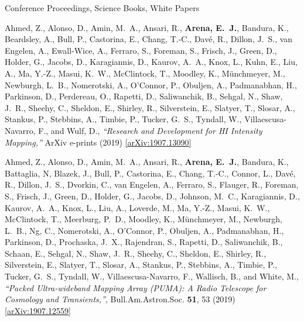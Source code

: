 \documentclass{resume} %
\begin{document}
\begin{rSection}{Conference Proceedings, Science Books, White Papers}

\begin{etaremune}

\item {Ahmed}, Z., {Alonso}, D., {Amin}, M.~A.,
         {Ansari}, R., \textbf{{Arena}, E.~J.}, {Bandura}, K.,
         {Beardsley}, A., {Bull}, P., {Castorina}, E.,
         {Chang}, T.-C., {Dav{\'e}}, R., {Dillon}, J.~S.,
         {van Engelen}, A., {Ewall-Wice}, A., {Ferraro}, S.,
         {Foreman}, S., {Frisch}, J., {Green}, D.,
         {Holder}, G., {Jacobs}, D., {Karagiannis}, D.,
         {Kaurov}, A.~A., {Knox}, L., {Kuhn}, E.,
         {Liu}, A., {Ma}, Y.-Z., {Masui}, K.~W.,
         {McClintock}, T., {Moodley}, K.,
         {M{\"u}nchmeyer}, M., {Newburgh}, L.~B.,
         {Nomerotski}, A., {O'Connor}, P., {Obuljen}, A.,
         {Padmanabhan}, H., {Parkinson}, D., {Perdereau}, O.,
         {Rapetti}, D., {Saliwanchik}, B., {Sehgal}, N.,
         {Shaw}, J.~R., {Sheehy}, C., {Sheldon}, E.,
         {Shirley}, R., {Silverstein}, E., {Slatyer}, T.,
         {Slosar}, A., {Stankus}, P., {Stebbins}, A.,
         {Timbie}, P., {Tucker}, G.~S., {Tyndall}, W.,
         {Villaescusa-Navarro}, F., and {Wulf}, D.,
         \textit{``Research and Development for HI Intensity Mapping,''} ArXiv e-prints (2019) \href{https://arxiv.org/abs/1907.13090}{[arXiv:1907.13090]}

\item {Ahmed}, Z., {Alonso}, D., {Amin}, M.~A.,
         {Ansari}, R., \textbf{{Arena}, E.~J.}, {Bandura}, K.,
         {Battaglia}, N, {Blazek}, J., 
         {Bull}, P., {Castorina}, E.,
         {Chang}, T.-C., {Connor}, L., {Dav{\'e}}, R., {Dillon}, J.~S.,
         {Dvorkin}, C.,
         {van Engelen}, A., {Ferraro}, S., {Flauger}, R.,
         {Foreman}, S., {Frisch}, J., {Green}, D.,
         {Holder}, G., {Jacobs}, D., {Johnson}, M.~C.,
         {Karagiannis}, D.,
         {Kaurov}, A.~A., {Knox}, L., 
         {Liu}, A., {Loverde}, M., {Ma}, Y.-Z., {Masui}, K.~W.,
         {McClintock}, T., {Meerburg}, P.~D., {Moodley}, K.,
         {M{\"u}nchmeyer}, M., {Newburgh}, L.~B., {Ng}, C.,
         {Nomerotski}, A., {O'Connor}, P., {Obuljen}, A.,
         {Padmanabhan}, H., {Parkinson}, D., {Prochaska}, J.~X.,
         {Rajendran}, S.,
         {Rapetti}, D., {Saliwanchik}, B., {Schaan}, E., {Sehgal}, N.,
         {Shaw}, J.~R., {Sheehy}, C., {Sheldon}, E.,
         {Shirley}, R., {Silverstein}, E., {Slatyer}, T.,
         {Slosar}, A., {Stankus}, P., {Stebbins}, A.,
         {Timbie}, P., {Tucker}, G.~S., {Tyndall}, W.,
         {Villaescusa-Navarro}, F., {Wallisch}, B., and {White}, M.,
\textit{``Packed Ultra-wideband Mapping Array (PUMA): A Radio Telescope for Cosmology and Transients,''}, Bull.Am.Astron.Soc. \textbf{51}, 53 (2019)  \href{https://arxiv.org/abs/1907.12559}{[arXiv:1907.12559]}



\end{etaremune}
\end{rSection}
\end{document}
